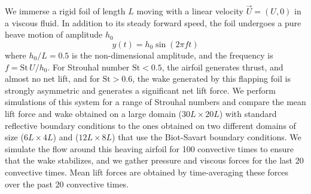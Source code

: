 \documentclass[final,1p,times]{elsarticle}
\begin{document}
We immerse a rigid foil of length $L$ moving with a linear velocity $\vec{U}=(U,0)$ in a viscous fluid. In addition to its steady forward speed, the foil undergoes a pure heave motion of amplitude $h_0$
\begin{equation}
    y(t) = h_0 \sin(2\pi f t)
\end{equation}
where $h_0/L=0.5$ is the non-dimensional amplitude, and the frequency is $f = \text{St}\,U/h_0$. For Strouhal number $\text{St}<0.5$, the airfoil generates thrust, and almost no net lift, and for $\text{St}>0.6$, the wake generated by this flapping foil is strongly asymmetric and generates a significant net lift force. We perform simulations of this system for a range of Strouhal numbers and compare the mean lift force and wake obtained on a large domain ($30L\times20L$) with standard reflective boundary conditions to the ones obtained on two different domains of size ($6L\times4L$) and ($12L\times8L$) that use the Biot-Savart boundary conditions. We simulate the flow around this heaving airfoil for 100 convective times to ensure that the wake stabilizes, and we gather pressure and viscous forces for the last 20 convective times. Mean lift forces are obtained by time-averaging these forces over the past 20 convective times.
\end{document}

